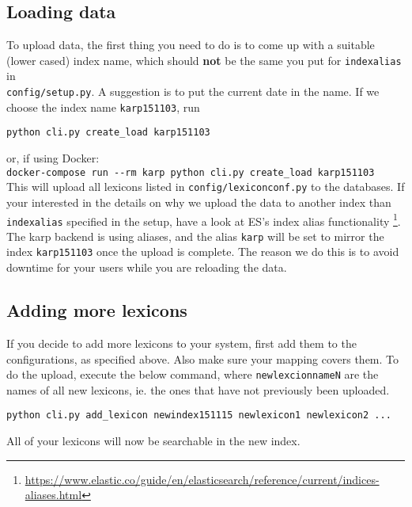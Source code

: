 \documentclass[
12pt, %
a4paper, %
oneside, %
headinclude,footinclude, %
BCOR0mm, %
]{scrartcl}
\begin{document}
\subsection{Loading data}
%
To upload data, the first thing you need to do is to come up with a suitable
(lower cased) index name, which should {\bf not} be the same you put for
\verb|indexalias| in \\
\verb|config/setup.py|.  A suggestion is to put the
current date in the name. If we choose the index name \verb|karp151103|, run
\begin{verbatim}
python cli.py create_load karp151103
\end{verbatim}
or, if using Docker:\\
\verb|docker-compose run --rm karp python cli.py create_load karp151103|\\

This will upload all lexicons listed in \verb|config/lexiconconf.py| to the databases.
If your interested in the details on why we upload the data to another index
than \verb|indexalias| specified in the setup, have a look at ES's index alias functionality%
\footnote{\url{https://www.elastic.co/guide/en/elasticsearch/reference/current/indices-aliases.html}}.
The karp backend is using aliases, and the alias \verb|karp| will be set to mirror the index
\verb|karp151103| once the upload is complete.  The reason we do this is to avoid
downtime for your users while you are reloading the data.

\subsection{Adding more lexicons}
\enlargethispage{\baselineskip} %
If you decide to add more lexicons to your system, first add them to the configurations, as specified
above. Also make sure your mapping covers them. To do the upload, execute the below command, where
\verb|newlexcionnameN|
are the names of all new lexicons, ie. the ones that have not previously been uploaded.
\begin{verbatim}
python cli.py add_lexicon newindex151115 newlexicon1 newlexicon2 ...
\end{verbatim}
%
All of your lexicons will now be searchable in the new index.
\end{document}
